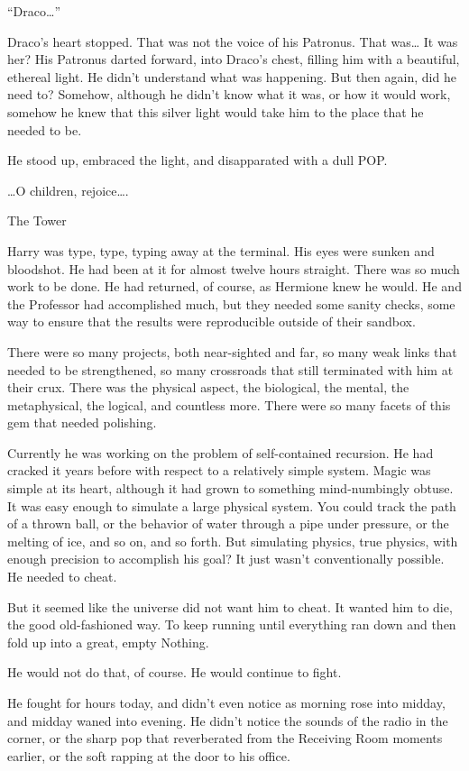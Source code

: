 “Draco…”

Draco’s heart stopped. That was not the voice of his Patronus. That was… It was her? His Patronus darted forward, into Draco’s chest, filling him with a beautiful, ethereal light. He didn’t understand what was happening. But then again, did he need to? Somehow, although he didn’t know what it was, or how it would work, somehow he knew that this silver light would take him to the place that he needed to be.

He stood up, embraced the light, and disapparated with a dull POP.

…O children, rejoice….

The Tower

Harry was type, type, typing away at the terminal. His eyes were sunken and bloodshot. He had been at it for almost twelve hours straight. There was so much work to be done. He had returned, of course, as Hermione knew he would. He and the Professor had accomplished much, but they needed some sanity checks, some way to ensure that the results were reproducible outside of their sandbox.

There were so many projects, both near-sighted and far, so many weak links that needed to be strengthened, so many crossroads that still terminated with him at their crux. There was the physical aspect, the biological, the mental, the metaphysical, the logical, and countless more. There were so many facets of this gem that needed polishing.

Currently he was working on the problem of self-contained recursion. He had cracked it years before with respect to a relatively simple system. Magic was simple at its heart, although it had grown to something mind-numbingly obtuse. It was easy enough to simulate a large physical system. You could track the path of a thrown ball, or the behavior of water through a pipe under pressure, or the melting of ice, and so on, and so forth. But simulating physics, true physics, with enough precision to accomplish his goal? It just wasn’t conventionally possible. He needed to cheat.

But it seemed like the universe did not want him to cheat. It wanted him to die, the good old-fashioned way. To keep running until everything ran down and then fold up into a great, empty Nothing.

He would not do that, of course. He would continue to fight.

He fought for hours today, and didn’t even notice as morning rose into midday, and midday waned into evening. He didn’t notice the sounds of the radio in the corner, or the sharp pop that reverberated from the Receiving Room moments earlier, or the soft rapping at the door to his office.

